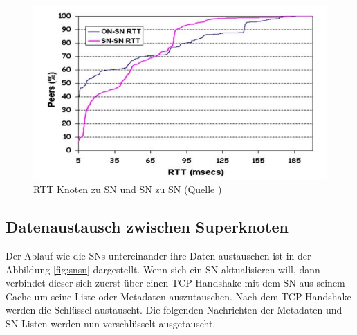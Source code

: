 \begin{figure}
\includegraphics[scale=0.3]{gfx/rttSns}
\caption{RTT Knoten zu SN und SN zu SN (Quelle \cite{liang2006fasttrack})}
\label{fig:rtt}
\end{figure}

\subsection{Datenaustausch zwischen Superknoten}
\label{subsec:sntosn}

Der Ablauf wie die SNs untereinander ihre Daten austauschen ist in der Abbildung \ref{fig:snsn} dargestellt.
Wenn sich ein SN aktualisieren will, dann verbindet dieser sich zuerst über einen TCP Handshake mit dem SN aus seinem Cache um seine Liste oder Metadaten auszutauschen.
Nach dem TCP Handshake werden die Schlüssel austauscht.
Die folgenden Nachrichten der Metadaten und SN Listen werden nun verschlüsselt ausgetauscht.

